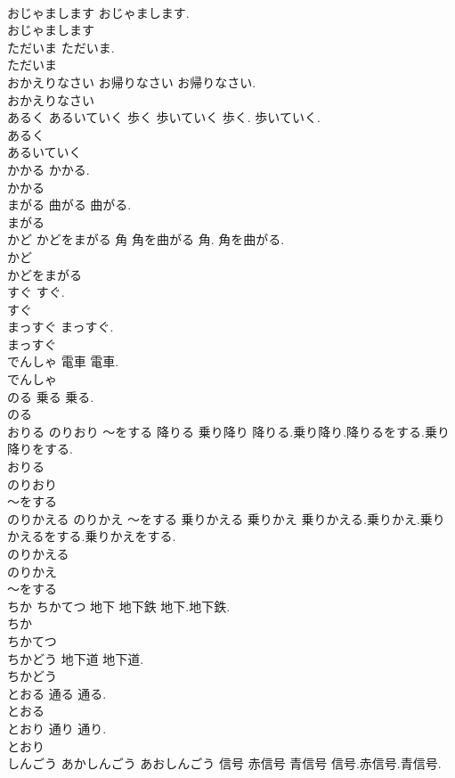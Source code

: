 \documentclass[8pt]{extreport}
\begin{document}
\begin{CJK}{UTF8}{min}
\\	おじゃまします		おじゃまします.	
\\	おじゃまします
\\	ただいま		ただいま.	
\\	ただいま
\\	おかえりなさい	お帰りなさい	お帰りなさい.	
\\	おかえりなさい
\\	あるく あるいていく	歩く 歩いていく	歩く. 歩いていく.	
\\	あるく
\\	あるいていく
\\	かかる		かかる.	
\\	かかる
\\	まがる	曲がる	曲がる.	
\\	まがる
\\	かど かどをまがる	角 角を曲がる	角. 角を曲がる.	
\\	かど
\\	かどをまがる
\\	すぐ		すぐ.	
\\	すぐ
\\	まっすぐ		まっすぐ.	
\\	まっすぐ
\\	でんしゃ	電車	電車.	
\\	でんしゃ
\\	のる	乗る	乗る.	
\\	のる
\\	おりる のりおり ～をする	降りる 乗り降り	降りる.乗り降り.降りるをする.乗り降りをする.	
\\	おりる
\\	のりおり
\\	～をする
\\	のりかえる のりかえ ～をする	乗りかえる 乗りかえ	乗りかえる.乗りかえ.乗りかえるをする.乗りかえをする.	
\\	のりかえる
\\	のりかえ
\\	～をする
\\	ちか ちかてつ	地下 地下鉄	地下.地下鉄.	
\\	ちか
\\	ちかてつ
\\	ちかどう	地下道	地下道.	
\\	ちかどう
\\	とおる	通る	通る.	
\\	とおる
\\	とおり	通り	通り.	
\\	とおり
\\	しんごう あかしんごう あおしんごう	信号 赤信号 青信号	信号.赤信号.青信号.	

\end{CJK}
\end{document}
